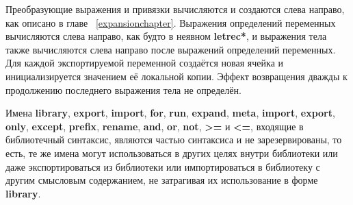 Преобразующие выражения и привязки вычисляются и создаются слева направо, как описано в главе
~\ref{expansionchapter}. Выражения определений переменных вычисляются слева направо, как будто в
неявном {\cf\bfseries letrec*}, и выражения тела также вычисляются слева направо после выражений
определений переменных. Для каждой экспортируемой переменной создаётся новая ячейка и
инициализируется значением её локальной копии. Эффект возвращения дважды к продолжению
последнего выражения тела не определён.\vspace{1mm}

\begin{note}
Имена {\cf\bfseries library}, {\cf\bfseries export}, {\cf\bfseries import}, {\cf\bfseries for},
{\cf\bfseries run}, {\cf\bfseries expand}, {\cf\bfseries meta}, {\cf\bfseries import},
{\cf\bfseries export}, {\cf\bfseries only}, {\cf\bfseries except}, {\cf\bfseries prefix},
{\cf\bfseries rename}, {\cf\bfseries and}, {\cf\bfseries or}, {\cf\bfseries not}, {\cf\bfseries
  >=} и {\cf\bfseries <=}, входящие в библиотечный синтаксис, являются частью синтаксиса и не
зарезервированы, то есть, те же имена могут использоваться в других целях внутри
библиотеки или даже экспортироваться из библиотеки или импортироваться в библиотеку с другим
смысловым содержанием, не затрагивая их использование в форме {\cf\bfseries library}.
\end{note}


